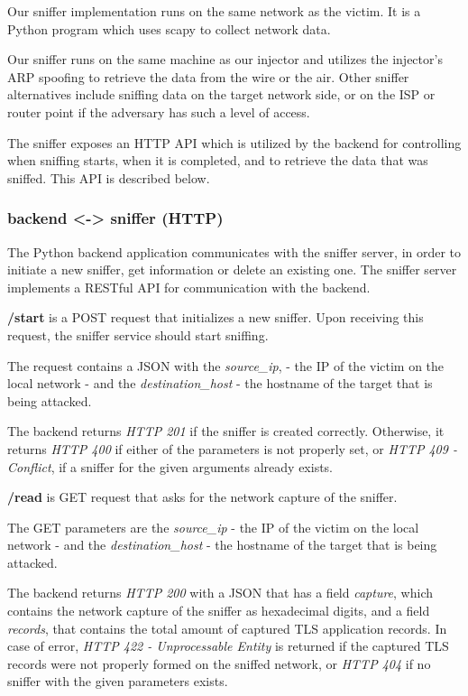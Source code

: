 Our sniffer implementation runs on the same network as the victim. It is a
Python program which uses scapy \cite{scapy} to
collect network data.

Our sniffer runs on the same machine as our injector and utilizes the
injector's ARP spoofing to retrieve the data from the wire or the air. 
Other sniffer alternatives include sniffing data on the target network side, or
on the ISP or router point if the adversary has such a level of access.

The sniffer exposes an HTTP API which is utilized by the backend for
controlling when sniffing starts, when it is completed, and to retrieve the
data that was sniffed. This API is described below.


\subsubsection{backend <-> sniffer (HTTP)}

The Python backend application communicates with the sniffer server, in order
to initiate a new sniffer, get information or delete an existing one. The  sniffer 
server implements a RESTful API for communication with the backend.

\textbf{/start} is a POST request that initializes a new sniffer.
Upon receiving this request, the sniffer service should start sniffing.

The request contains a JSON with the \textit{source\_ip}, 
- the IP of the victim on the local network - and the \textit{destination\_host}
- the hostname of the target that is being attacked.

The backend returns \textit{HTTP 201} if the sniffer is created correctly. Otherwise, it returns
\textit{HTTP 400} if either of the parameters is not properly set, or \textit{HTTP 409 -
Conflict}, if a sniffer for the given arguments already exists.

\textbf{/read} is GET request that asks for the network capture of the sniffer.

The GET parameters are the \textit{source\_ip}  - the IP of the victim on the local network -
and the \textit{destination\_host} - the hostname of the target that is being attacked.

The backend returns \textit{HTTP 200} with a JSON that has a field \textit{capture}, which contains the
network capture of the sniffer as hexadecimal digits, and a field \textit{records},
that contains the total amount of captured TLS application records. In case of
error, \textit{HTTP 422 - Unprocessable Entity} is returned if the captured TLS
records were not properly formed on the sniffed network, or \textit{HTTP 404} if no
sniffer with the given parameters exists.

